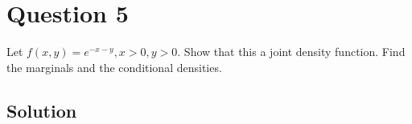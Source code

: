 \section*{Question 5}

Let \( f(x, y)=e^{-x-y}, x>0, y>0 \).
Show that this a joint density function.
Find the marginals and the conditional densities.

\subsection*{Solution}
